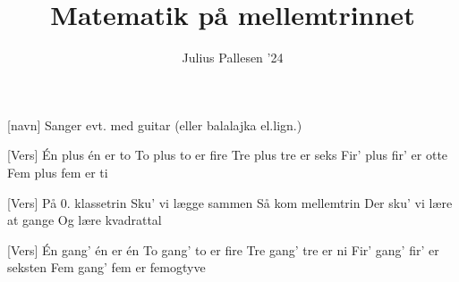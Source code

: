 \documentclass[a4paper,11pt]{article}
\title{Matematik på mellemtrinnet}
\author{Julius Pallesen '24}
\begin{document}
\maketitle

\begin{roles}
[navn] Sanger evt. med guitar (eller balalajka el.lign.)
\end{roles}



\begin{song}
    [Vers] Én plus én er to
    To plus to er fire
    Tre plus tre er seks
    Fir' plus fir' er otte
    Fem plus fem er ti


    [Vers] På 0. klassetrin
    Sku' vi lægge sammen
    Så kom mellemtrin
    Der sku' vi lære at gange
    Og lære kvadrattal

    [Vers] Én gang' én er én
    To gang' to er fire
    Tre gang' tre er ni
    Fir' gang' fir' er seksten
    Fem gang' fem er femogtyve
\end{song}
\end{document}
